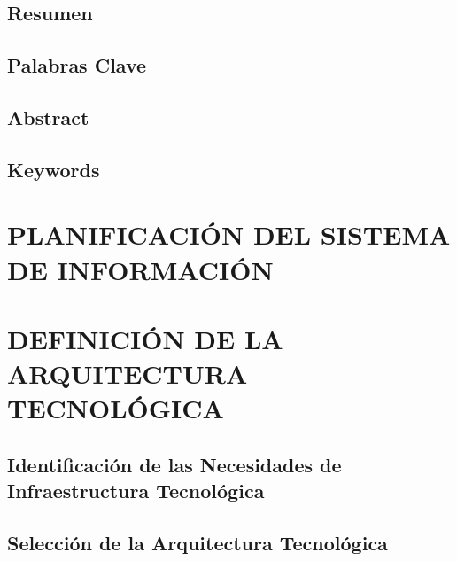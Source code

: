 \documentclass[11pt]{report} %
\begin{document}
\section{Resumen}


\section{Palabras Clave}


\section{Abstract}


\section{Keywords}
\newpage
\pagestyle{fancy}

\chapter{PLANIFICACIÓN DEL SISTEMA DE INFORMACIÓN}

\noindent{}
\newpage




\chapter{DEFINICIÓN DE LA ARQUITECTURA TECNOLÓGICA}
\noindent{}
\newpage

\section{Identificación de las Necesidades de Infraestructura Tecnológica} 

\newpage
\section{Selección de la Arquitectura Tecnológica} 
\end{document}
